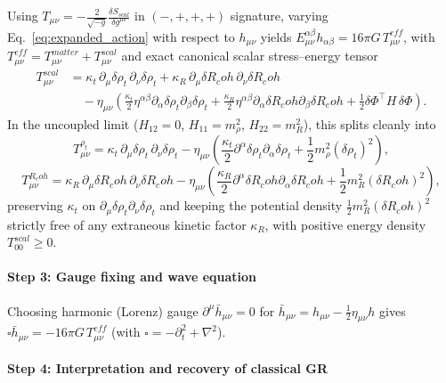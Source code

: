 \documentclass[american,11pt,letterpaper]{article}
\newcommand{\Rcoh}{R_{\mathrm{coh}}}
\def\mathcal#1{#1}%
\def\mathrm#1{#1}%
\def\Rcoh{R_coh}%
\begin{document}
Using $T_{\mu\nu} = -\frac{2}{\sqrt{-g}}\frac{\delta S_{\mathrm{scal}}}{\delta g^{\mu\nu}}$ in $(-,+,+,+)$ signature, varying Eq.~\eqref{eq:expanded_action} with respect to $h_{\mu\nu}$ yields $\mathcal{E}_{\mu\nu}^{\alpha\beta} h_{\alpha\beta} = 16 \pi G \, T_{\mu\nu}^{\mathrm{eff}}$, with $T_{\mu\nu}^{\mathrm{eff}} = T_{\mu\nu}^{\mathrm{matter}} + T_{\mu\nu}^{\mathrm{scal}}$ and exact canonical scalar stress--energy tensor
\begin{align*}
T_{\mu\nu}^{\mathrm{scal}}
&= \kappa_t\,\partial_\mu \delta \rho_t\,\partial_\nu \delta \rho_t
 + \kappa_R\,\partial_\mu \delta \Rcoh\,\partial_\nu \delta \Rcoh \\
&\quad - \eta_{\mu\nu}\!\left(
  \frac{\kappa_t}{2}\eta^{\alpha\beta}\partial_\alpha\delta\rho_t\partial_\beta\delta\rho_t
  + \frac{\kappa_R}{2}\eta^{\alpha\beta}\partial_\alpha\delta\Rcoh\partial_\beta\delta\Rcoh
  + \frac{1}{2}\delta\Phi^\top H\,\delta\Phi
\right).
\end{align*}
In the uncoupled limit ($H_{12} = 0$, $H_{11} = m_\rho^2$, $H_{22} = m_R^2$), this splits cleanly into
\[
T_{\mu\nu}^{\rho_t} = \kappa_t\,\partial_\mu \delta \rho_t\,\partial_\nu \delta \rho_t - \eta_{\mu\nu}\!\left(\frac{\kappa_t}{2}\partial^\alpha \delta \rho_t \partial_\alpha \delta \rho_t + \frac{1}{2} m_{\rho}^2 (\delta \rho_t)^2\right),
\]
\[
T_{\mu\nu}^{\Rcoh} = \kappa_R\,\partial_\mu \delta \Rcoh\,\partial_\nu \delta \Rcoh - \eta_{\mu\nu}\!\left(\frac{\kappa_R}{2}\partial^\alpha \delta \Rcoh \partial_\alpha \delta \Rcoh + \frac{1}{2} m_{R}^2 (\delta \Rcoh)^2\right),
\]
preserving $\kappa_t$ on $\partial_\mu\delta\rho_t\partial_\nu\delta\rho_t$ and keeping the potential density $\frac{1}{2}m_R^2(\delta\Rcoh)^2$ strictly free of any extraneous kinetic factor $\kappa_R$, with positive energy density $T_{00}^{\mathrm{scal}} \ge 0$.

\paragraph{Step 3: Gauge fixing and wave equation}

Choosing harmonic (Lorenz) gauge $\partial^\mu \bar{h}_{\mu\nu} = 0$ for $\bar{h}_{\mu\nu} = h_{\mu\nu} - \frac{1}{2}\eta_{\mu\nu} h$ gives $\square \bar{h}_{\mu\nu} = -16\pi G\,T_{\mu\nu}^{\mathrm{eff}}$ (with $\square = -\partial_t^2 + \nabla^2$).

\paragraph{Step 4: Interpretation and recovery of classical GR}
\end{document}
